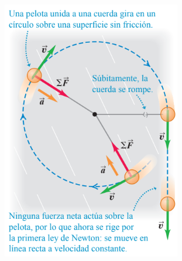 \begin{frame}
\begin{columns}
    \begin{figure}
        \centering
        \includegraphics[width=\linewidth]{figures/Fcpta.png}
    \end{figure}
    \begin{figure}
        \centering

\end{figure}
\end{columns}
\end{frame}

